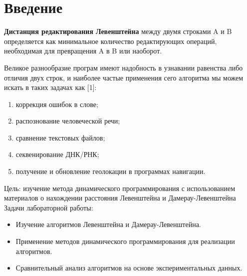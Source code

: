 \tableofcontents{}


\chapter{Введение}
\label{cha:appendix2}

\textbf{Дистанция редактирования Левенштейна} между двумя строками A и B определяется как минимальное количество редактирующих операций, необходимая для превращения A в B или наоборот. 

Великое разнообразие програм имеют надобность в узнавании равенства либо отличия двух строк, и наиболее частые применения сего алгоритма мы можем искать в таких задачах как [1]:
\begin{enumerate}[1)]
    \item коррекция ошибок в слове;
    \item распознование человеческой речи;
    \item сравнение текстовых файлов;
    \item секвенирование ДНК/РНК;
    \item получение и обновление геолокации в программах навигации.
\end{enumerate}

Цель:
изучение метода динамического программирования с использованием материалов о нахождении расстояния Левенштейна и Дамерау-Левенштейна
Задачи лабораторной работы:
\begin{itemize}
    \item Изучение алгоритмов Левенштейна и Дамерау-Левенштейна.
    \item Применение методов динамического программирования для реализации алгоритмов.
    \item Сравнительный анализ алгоритмов на основе экспериментальных данных.
\end{itemize}